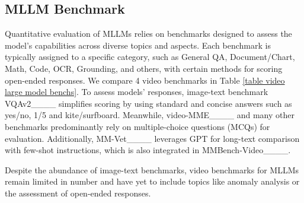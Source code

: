  \subsection{MLLM Benchmark}
Quantitative evaluation of MLLMs relies on benchmarks designed to assess the model’s capabilities across diverse topics and aspects. Each benchmark is typically assigned to a specific category, such as General QA, Document/Chart, Math, Code, OCR, Grounding, and others, with certain methods for scoring open-ended responses.  We compare 4 video benchmarks in Table \ref{table video large model benchs}. To assess models' responses, image-text benchmark VQAv2____ simplifies scoring by using standard and concise answers such as yes/no, 1/5 and kite/surfboard. 
  Meanwhile, video-MME____ and many other benchmarks predominantly rely on multiple-choice questions (MCQs) for evaluation. 
 Additionally, MM-Vet____ leverages GPT for long-text comparison with few-shot instructions, which is also integrated in MMBench-Video____.

 Despite the abundance of image-text benchmarks, video benchmarks for MLLMs remain limited in number and have yet to include topics like anomaly analysis or the assessment of open-ended responses.
